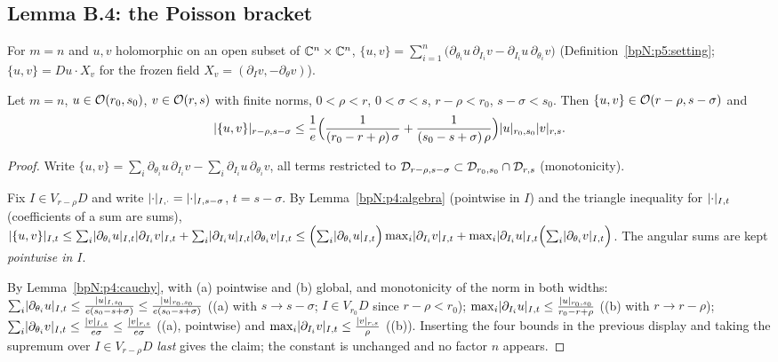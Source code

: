 \subsection{Lemma B.4: the Poisson bracket}\label{bpN:p4:s-b4}

For $m=n$ and $u,v$ holomorphic on an open subset of $\mathbb{C}^n\times\mathbb{C}^n$, $\{u,v\}=\sum_{i=1}^n\bigl(\partial_{\theta_i}u\,\partial_{I_i}v-\partial_{I_i}u\,\partial_{\theta_i}v\bigr)$ (Definition~\ref{bpN:p5:setting}; $\{u,v\}=Du\cdot X_v$ for the frozen field $X_v=(\partial_Iv,-\partial_\theta v)$).

\begin{lemma}[B.4]\label{bpN:p4:bracket}
Let $m=n$, $u\in\mathcal O(r_0,s_0)$, $v\in\mathcal O(r,s)$ with finite norms, $0<\rho<r$, $0<\sigma<s$, $r-\rho<r_0$, $s-\sigma<s_0$. Then $\{u,v\}\in\mathcal O(r-\rho,s-\sigma)$ and
\[\lvert \{u,v\}\rvert_{r-\rho,s-\sigma}\le\frac1e\Bigl(\frac1{(r_0-r+\rho)\,\sigma}+\frac1{(s_0-s+\sigma)\,\rho}\Bigr)\lvert u\rvert_{r_0,s_0}\lvert v\rvert_{r,s}.\]
\end{lemma}
\begin{proof}
Write $\{u,v\}=\sum_i\partial_{\theta_i}u\,\partial_{I_i}v-\sum_i\partial_{I_i}u\,\partial_{\theta_i}v$, all terms restricted to $\mathcal D_{r-\rho,s-\sigma}\subset\mathcal D_{r_0,s_0}\cap\mathcal D_{r,s}$ (monotonicity).

\label{stepN:p4:b4-four} Fix $I\in V_{r-\rho}D$ and write $\lvert \cdot\rvert_{I,\cdot}=\lvert \cdot\rvert_{I,s-\sigma}$, $t=s-\sigma$. By Lemma~\ref{bpN:p4:algebra} (pointwise in $I$) and the triangle inequality for $\lvert \cdot\rvert_{I,t}$ (coefficients of a sum are sums),
$\lvert \{u,v\}\rvert_{I,t}\le\sum_i\lvert \partial_{\theta_i}u\rvert_{I,t}\lvert \partial_{I_i}v\rvert_{I,t}+\sum_i\lvert \partial_{I_i}u\rvert_{I,t}\lvert \partial_{\theta_i}v\rvert_{I,t}
\le\Bigl(\sum_i\lvert \partial_{\theta_i}u\rvert_{I,t}\Bigr)\max_i\lvert \partial_{I_i}v\rvert_{I,t}+\max_i\lvert \partial_{I_i}u\rvert_{I,t}\Bigl(\sum_i\lvert \partial_{\theta_i}v\rvert_{I,t}\Bigr)$.
The angular sums are kept \emph{pointwise in $I$}.

\label{stepN:p4:b4-prod} By Lemma~\ref{bpN:p4:cauchy}, with (a) pointwise and (b) global, and monotonicity of the norm in both widths:
$\sum_i\lvert \partial_{\theta_i}u\rvert_{I,t}\le\frac{\lvert u\rvert_{I,s_0}}{e(s_0-s+\sigma)}\le\frac{\lvert u\rvert_{r_0,s_0}}{e(s_0-s+\sigma)}$ ((a) with $s\to s-\sigma$; $I\in V_{r_0}D$ since $r-\rho<r_0$);
$\max_i\lvert \partial_{I_i}u\rvert_{I,t}\le\frac{\lvert u\rvert_{r_0,s_0}}{r_0-r+\rho}$ ((b) with $r\to r-\rho$);
$\sum_i\lvert \partial_{\theta_i}v\rvert_{I,t}\le\frac{\lvert v\rvert_{I,s}}{e\sigma}\le\frac{\lvert v\rvert_{r,s}}{e\sigma}$ ((a), pointwise) and $\max_i\lvert \partial_{I_i}v\rvert_{I,t}\le\frac{\lvert v\rvert_{r,s}}\rho$ ((b)).
Inserting the four bounds in the previous display and taking the supremum over $I\in V_{r-\rho}D$ \emph{last} gives the claim; the constant is unchanged and no factor $n$ appears.
\end{proof}

